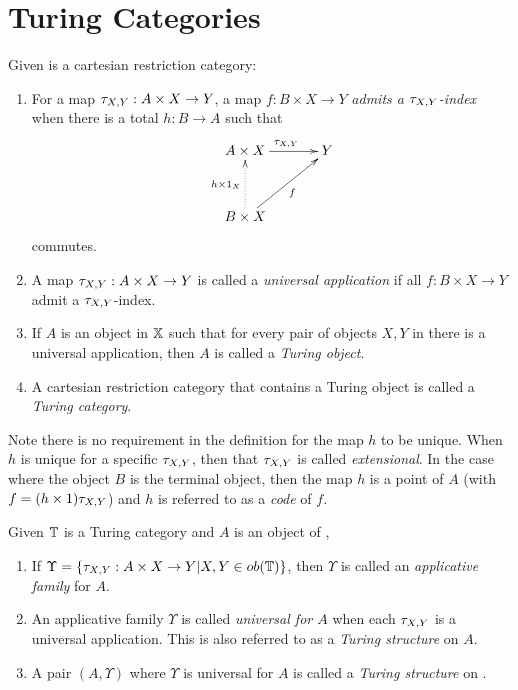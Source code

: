 \section{Turing Categories} %
\label{sec:turing_categories}

\begin{definition}\label{def:turing_category}
  Given \X is a cartesian restriction category:
  \begin{enumerate}
    \item For a map $\tau_{{X},{Y}}: A \times X \to Y$, a map $f:B\times X \to Y$ \emph{admits a $\tau_{{X},{Y}}$-index}
      when there is a total $h:B\to A$ such that
      \[
        \xymatrix@C+10pt@R+10pt{
          A\times X \ar[r]^{\txy} & Y \\
          B\times X \ar@{.>}[u]^{h\times 1_X} \ar[ur]_f
        }
      \]
      commutes.\label{defitem:turing_admit_txy_index}
    \item A map $\tau_{{X},{Y}}: A \times X \to Y$ is called a \emph{universal application} if all
      $f:B\times X \to Y$ admit a $\tau_{{X},{Y}}$-index.\label{defitem:turing_universal_application}
    \item If $A$ is an object in $\mathbb{X}$ such that for every pair of objects $X,Y$ in \X there is
      a universal application, then $A$ is called a \emph{Turing object}.
    \item A cartesian restriction category that contains a Turing object is called a
      \emph{Turing category}.
  \end{enumerate}
\end{definition}

Note there is no requirement in the definition for the map $h$ to be unique. When $h$ is unique
for a specific $\tau_{{X},{Y}}$, then that $\tau_{{X},{Y}}$ is called \emph{extensional}. In the case where the object
$B$ is the terminal object, then the map $h$ is a point of $A$ (with $f = (h \times 1)\tau_{{X},{Y}}$) and
$h$ is referred to as a \emph{code} of $f$.

\begin{definition}\label{def:turing_structure}
  Given $\mathbb{T}$ is a Turing category and $A$ is an object of \T,
  \begin{enumerate}
    \item If $\Upsilon=\{\tau_{{X},{Y}}: A\times X \to Y | X,Y \in ob(\mathbb{T})\}$, then $\Upsilon$ is called an
      \emph{applicative family} for $A$.
    \item An applicative family $\Upsilon$ is called \emph{universal for $A$} when each $\tau_{{X},{Y}}$ is
      a universal application. This is also referred to as a \emph{Turing structure} on $A$.
    \item A pair $(A,\Upsilon)$ where $\Upsilon$ is universal for $A$ is called a \emph{Turing
      structure} on \T.
  \end{enumerate}

\end{definition}



